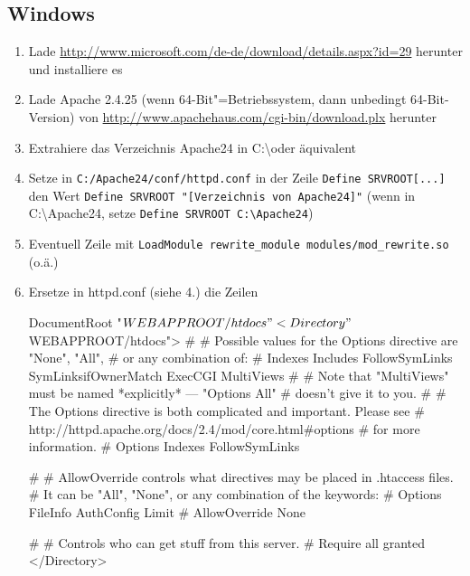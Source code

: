 \subsection{Windows}
\begin{enumerate}
\item Lade \url{http://www.microsoft.com/de-de/download/details.aspx?id=29} herunter und installiere es
\item Lade Apache 2.4.25 (wenn 64-Bit"=Betriebssystem, dann unbedingt 64-Bit-Version) von \url{http://www.apachehaus.com/cgi-bin/download.plx} herunter
\item Extrahiere das Verzeichnis Apache24 in C:\textbackslash oder äquivalent
\item Setze in \texttt{C:/Apache24/conf/httpd.conf} in der Zeile \texttt{Define SRVROOT[...]} den Wert \texttt{Define SRVROOT "[Verzeichnis von Apache24]"} 
\subitem (wenn in C:\textbackslash{}Apache24, setze \texttt{Define SRVROOT C:\textbackslash{}Apache24})
\item Eventuell Zeile mit \texttt{LoadModule rewrite\_module modules/mod\_rewrite.so} (o.ä.) 
\item Ersetze in httpd.conf (siehe 4.) die Zeilen

\begin{json}
DocumentRoot "${WEBAPPROOT}/htdocs"
<Directory "${WEBAPPROOT}/htdocs">
#
# Possible values for the Options directive are "None", "All",
# or any combination of:
#   Indexes Includes FollowSymLinks SymLinksifOwnerMatch ExecCGI MultiViews
#
# Note that "MultiViews" must be named *explicitly* --- "Options All"
# doesn't give it to you.
#
# The Options directive is both complicated and important.  Please see
# http://httpd.apache.org/docs/2.4/mod/core.html#options
# for more information.
#
Options Indexes FollowSymLinks

#
# AllowOverride controls what directives may be placed in .htaccess files.
# It can be "All", "None", or any combination of the keywords:
#   Options FileInfo AuthConfig Limit
#
AllowOverride None

#
# Controls who can get stuff from this server.
#
Require all granted
</Directory>
\end{json}


\end{enumerate}

